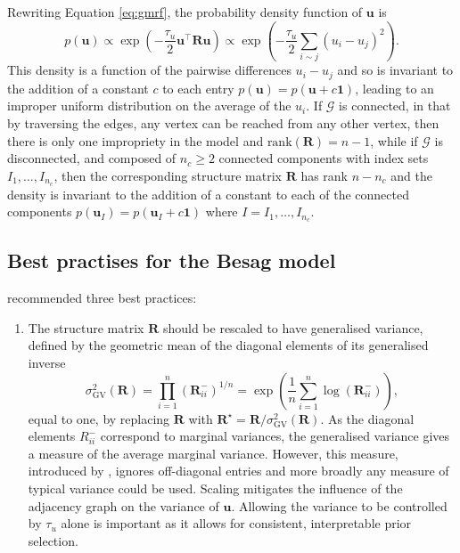 \documentclass[a4paper, nobind]{templates/ociamthesis}
\providecommand{\tightlist}{%
  \setlength{\itemsep}{0pt}\setlength{\parskip}{0pt}}
\begin{document}
Rewriting Equation \eqref{eq:gmrf}, the probability density function of \(\mathbf{u}\) is
\begin{equation}
    p(\mathbf{u})
    \propto \exp \left( -\frac{\tau_u}{2} \mathbf{u}^\top \mathbf{R} \mathbf{u} \right)
    \propto \exp \left( -\frac{\tau_u}{2} \sum_{i \sim j} (u_i - u_j)^2 \right). \label{eq:pdfu}
\end{equation}
This density is a function of the pairwise differences \(u_i - u_j\) and so is invariant to the addition of a constant \(c\) to each entry \(p(\mathbf{u}) = p(\mathbf{u} + c\mathbf{1})\), leading to an improper uniform distribution on the average of the \(u_i\).
If \(\mathcal{G}\) is connected, in that by traversing the edges, any vertex can be reached from any other vertex, then there is only one impropriety in the model and \(\text{rank}(\mathbf{R}) = n - 1\), while if \(\mathcal{G}\) is disconnected, and composed of \(n_c \geq 2\) connected components with index sets \(I_1, \ldots, I_{n_c}\), then the corresponding structure matrix \(\mathbf{R}\) has rank \(n - n_c\) and the density is invariant to the addition of a constant to each of the connected components \(p(\mathbf{u}_{I}) = p(\mathbf{u}_{I} + c\mathbf{1})\) where \(I = I_1, \ldots, I_{n_c}\).

\hypertarget{best-practises-for-the-besag-model}{%
\subsection{Best practises for the Besag model}\label{best-practises-for-the-besag-model}}

\textcite{freni2018note} recommended three best practices:

\begin{enumerate}
\def\labelenumi{\arabic{enumi}.}
\tightlist
\item
  The structure matrix \(\mathbf{R}\) should be rescaled to have generalised variance, defined by the geometric mean of the diagonal elements of its generalised inverse
  \begin{equation}
   \sigma^2_{\text{GV}}(\mathbf{R}) = \prod_{i = 1}^n (\mathbf{R}^-_{ii})^{1/n} = \exp \left( \frac{1}{n} \sum_{i = 1}^n \log (\mathbf{R}^-_{ii}) \right),
  \end{equation}
  equal to one, by replacing \(\mathbf{R}\) with \(\mathbf{R}^\star = \mathbf{R} / \sigma^2_{\text{GV}}(\mathbf{R})\).
  As the diagonal elements \(R^-_{ii}\) correspond to marginal variances, the generalised variance gives a measure of the average marginal variance.
  However, this measure, introduced by \textcite{sorbye2014scaling}, ignores off-diagonal entries and more broadly any measure of typical variance could be used.
  Scaling mitigates the influence of the adjacency graph on the variance of \(\mathbf{u}\).
  Allowing the variance to be controlled by \(\tau_u\) alone is important as it allows for consistent, interpretable prior selection.
\end{enumerate}
\end{document}

